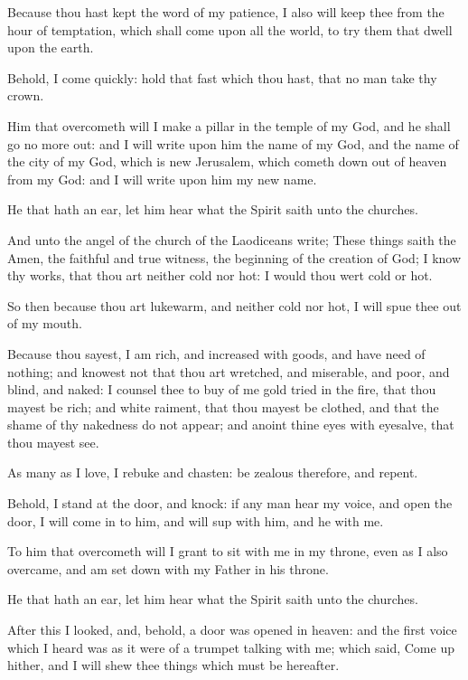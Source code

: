 \Verse Because thou hast kept the word of my patience, I also will keep thee from the hour of temptation, which shall come upon all the world, to try them that dwell upon the earth.

\Verse Behold, I come quickly: hold that fast which thou hast, that no man take thy crown.

\Verse Him that overcometh will I make a pillar in the temple of my God, and he shall go no more out: and I will write upon him the name of my God, and the name of the city of my God, which is new Jerusalem, which cometh down out of heaven from my God: and I will write upon him my new name.

\Verse He that hath an ear, let him hear what the Spirit saith unto the churches.

\Verse And unto the angel of the church of the Laodiceans write; These things saith the Amen, the faithful and true witness, the beginning of the creation of God; \Verse I know thy works, that thou art neither cold nor hot: I would thou wert cold or hot.

\Verse So then because thou art lukewarm, and neither cold nor hot, I will spue thee out of my mouth.

\Verse Because thou sayest, I am rich, and increased with goods, and have need of nothing; and knowest not that thou art wretched, and miserable, and poor, and blind, and naked: \Verse I counsel thee to buy of me gold tried in the fire, that thou mayest be rich; and white raiment, that thou mayest be clothed, and that the shame of thy nakedness do not appear; and anoint thine eyes with eyesalve, that thou mayest see.

\Verse As many as I love, I rebuke and chasten: be zealous therefore, and repent.

\Verse Behold, I stand at the door, and knock: if any man hear my voice, and open the door, I will come in to him, and will sup with him, and he with me.

\Verse To him that overcometh will I grant to sit with me in my throne, even as I also overcame, and am set down with my Father in his throne.

\Verse He that hath an ear, let him hear what the Spirit saith unto the churches.

\Chapter
\Verse After this I looked, and, behold, a door was opened in heaven: and the first voice which I heard was as it were of a trumpet talking with me; which said, Come up hither, and I will shew thee things which must be hereafter.

